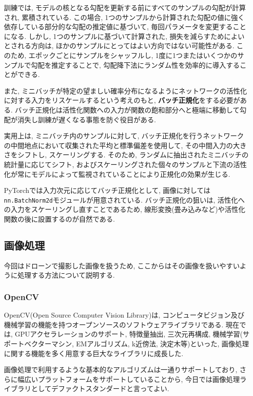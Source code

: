 \documentclass[dvipdfmx]{jsarticle}
\begin{document}
訓練では, モデルの核となる勾配を更新する前にすべてのサンプルの勾配が計算され, 累積されている.
この場合, 1つのサンプルから計算された勾配の値に強く依存している部分的な勾配の推定値に基づいて, 毎回パラメータを変更することになる.
しかし, 1つのサンプルに基づいて計算された, 損失を減らすためによいとされる方向は, ほかのサンプルにとってはよい方向ではない可能性がある.
このため, エポックごとにサンプルをシャッフルし, 1度に1つまたはいくつかのサンプルで勾配を推定することで, 勾配降下法にランダム性を効率的に導入することができる.

また, ミニバッチが特定の望ましい確率分布になるようにネットワークの活性化に対する入力をリスケールするという考えのもと, \textbf{バッチ正規化}をする必要がある.
バッチ正規化は活性化関数への入力が関数の飽和部分へと極端に移動して勾配が消失し訓練が遅くなる事態を防ぐ役目がある.

実用上は, ミニバッチ内のサンプルに対して, バッチ正規化を行うネットワークの中間地点において収集された平均と標準偏差を使用して, その中間入力の大きさをシフトし, スケーリングする.
そのため, ランダムに抽出されたミニバッチの統計量に応じてシフト, およびスケーリングされた個々のサンプルと下流の活性化が常にモデルによって監視されていることにより正規化の効果が生じる.

PyTorchでは入力次元に応じてバッチ正規化として,  画像に対しては \verb+nn.BatchNorm2d+モジュールが用意されている.
バッチ正規化の狙いは, 活性化への入力をスケーリングし直すことであるため, 線形変換(畳み込みなど)や活性化関数の後に設置するのが自然である.


\subsection{画像処理}
今回はドローンで撮影した画像を扱うため, ここからはその画像を扱いやすいように処理する方法について説明する.

\subsubsection{OpenCV}
OpenCV(Open Source Computer Vision Library)は, コンピュータビジョン及び機械学習の機能を持つオープンソースのソフトウェアライブラリである.
現在では, GPUアクセラレーションのサポート, 特徴量抽出, 三次元再構成, 機械学習(サポートベクターマシン, EMアルゴリズム, k近傍法, 決定木等)といった, 画像処理に関する機能を多く用意する巨大なライブラリに成長した.

画像処理で利用するような基本的なアルゴリズムは一通りサポートしており, さらに幅広いプラットフォームをサポートしていることから, 今日では画像処理ライブラリとしてデファクトスタンダードと言ってよい.
\end{document}
